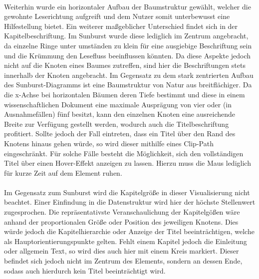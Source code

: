 \\
Weiterhin wurde ein horizontaler Aufbau der Baumstruktur gew\"ahlt, welcher die gewohnte Leserichtung aufgreift und dem Nutzer somit unterbewusst eine Hilfestellung bietet. Ein weiterer ma{\ss}geblicher Unterschied findet sich in der Kapitelbeschriftung. Im Sunburst wurde diese lediglich im Zentrum angebracht, da einzelne Ringe unter umst\"anden zu klein f\"ur eine ausgiebige Beschriftung sein und die Kr\"ummung den Lesefluss beeinflussen k\"onnten. Da diese Aspekte jedoch nicht auf die Knoten eines Baumes zutreffen, sind hier die Beschriftungen stets innerhalb der Knoten angebracht. Im Gegensatz zu dem stark zentrierten Aufbau des Sunburst-Diagramms ist eine Baumstruktur von Natur aus breitfl\"achiger. Da die x-Achse bei horizontalen B\"aumen deren Tiefe bestimmt und diese in einem wissenschaftlichen Dokument eine maximale Auspr\"agung von vier oder (in Ausnahmef\"allen) f\"unf besitzt, kann den einzelnen Knoten eine ausreichende Breite zur Verf\"ugung gestellt werden, wodurch auch die Titelbeschriftung profitiert. Sollte jedoch der Fall eintreten, dass ein Titel \"uber den Rand des Knotens hinaus gehen w\"urde, so wird dieser mithilfe eines Clip-Path eingeschr\"ankt. F\"ur solche F\"alle besteht die M\"oglichkeit, sich den vollst\"andigen Titel \"uber einen Hover-Effekt anzeigen zu lassen. Hierzu muss die Maus lediglich f\"ur kurze Zeit auf dem Element ruhen.\\
\\
Im Gegensatz zum Sunburst wird die Kapitelgr\"o{\ss}e in dieser Visualisierung nicht beachtet. Einer Einfindung in die Datenstruktur wird hier der h\"ochste Stellenwert zugesprochen. Die repr\"asentativste Veranschaulichung der Kapitelg\"o{\ss}en w\"are anhand der proportionalen Gr\"o{\ss}e oder Position des jeweiligen Knotens. Dies w\"urde jedoch die Kapitelhierarchie oder Anzeige der Titel beeintr\"achtigen, welche als Hauptorientierungspunkte gelten. Fehlt einem Kapitel jedoch die Einleitung oder allgemein Text, so wird dies auch hier mit einem Kreis markiert. Dieser befindet sich jedoch nicht im Zentrum des Elements, sondern an dessen Ende, sodass auch hierdurch kein Titel beeintr\"achtigt wird. \\
\\
